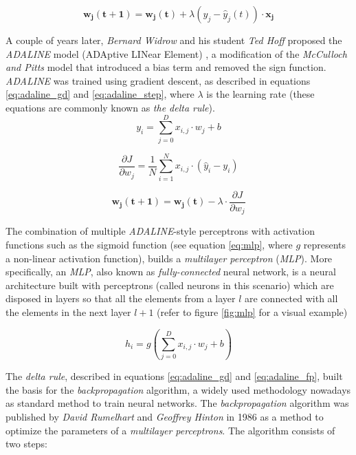 \begin{equation}
\label{eq:rosenblatt}
\mathbf{w_j(t+1)} = \mathbf{w_j(t)} + \lambda (y_j-\hat{y}_j(t))\cdot \mathbf{x_j}
\end{equation}

 A couple of years later, \textit{Bernard Widrow} and his student \textit{Ted Hoff} proposed the \textit{ADALINE} model (ADAptive LINear Element) \autocite{widrow1960}, a modification of the \textit{McCulloch and Pitts} model that introduced a bias term and removed the sign function. \textit{ADALINE} was trained using gradient descent, as described in equations \ref{eq:adaline_gd} and \ref{eq:adaline_step}, where $\lambda$ is the learning rate (these equations are commonly known as \textit{the delta rule}).
\begin{equation}
\label{eq:adaline_fp}
y_i = \sum_{j=0}^{D} x_{i,j} \cdot w_{j} + b
\end{equation}

\begin{equation}
\label{eq:adaline_gd}
\frac{\partial J}{\partial{w_j}} = \frac{1}{N} \sum_{i=1}^{N} x_{i,j} \cdot(\hat{y}_i - y_i)
\end{equation}

\begin{equation}
\label{eq:adaline_step}
\mathbf{w_j(t+1)} = \mathbf{w_j(t)} - \lambda \cdot \frac{\partial J}{\partial {w_j}}
\end{equation}


 The combination of multiple \textit{ADALINE}-style perceptrons with activation functions such as the sigmoid function (see equation \ref{eq:mlp}, where $g$ represents a non-linear activation function), builds a \textit{multilayer perceptron} (\textit{MLP}). More specifically, an \textit{MLP}, also known as \textit{fully-connected} neural network, is a neural architecture built with perceptrons (called neurons in this scenario) which are disposed in layers so that all the elements from a layer $l$ are connected with all the elements in the next layer $l+1$ (refer to figure \ref{fig:mlp} for a visual example)


 \begin{equation}
 \label{eq:mlp}
 h_i = g\left(\sum_{j=0}^{D} x_{i,j} \cdot w_{j} + b\right)
 \end{equation}

 The \textit{delta rule}, described in equations \ref{eq:adaline_gd} and \ref{eq:adaline_fp}, built the basis for the \textit{backpropagation} algorithm, a widely used methodology nowadays as standard method to train neural networks. The \textit{backpropagation} algorithm \autocite{hinton1986} was published by \textit{David Rumelhart} and \textit{Geoffrey Hinton} in 1986 as a method to optimize the parameters of a \textit{multilayer perceptrons}. The algorithm consists of two steps:

